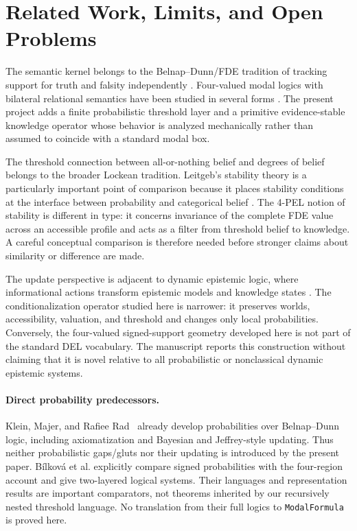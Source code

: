 \section{Related Work, Limits, and Open Problems}
\label{sec:limits}

The semantic kernel belongs to the Belnap--Dunn/FDE tradition of tracking support for truth and falsity independently \cite{Belnap1977,Dunn1976}. Four-valued modal logics with bilateral relational semantics have been studied in several forms \cite{OdintsovWansing2010,RivieccioJungJansana2017}. The present project adds a finite probabilistic threshold layer and a primitive evidence-stable knowledge operator whose behavior is analyzed mechanically rather than assumed to coincide with a standard modal box.

The threshold connection between all-or-nothing belief and degrees of belief belongs to the broader Lockean tradition. Leitgeb's stability theory is a particularly important point of comparison because it places stability conditions at the interface between probability and categorical belief \cite{Leitgeb2014}. The 4-PEL notion of stability is different in type: it concerns invariance of the complete FDE value across an accessible profile and acts as a filter from threshold belief to knowledge. A careful conceptual comparison is therefore needed before stronger claims about similarity or difference are made.

The update perspective is adjacent to dynamic epistemic logic, where informational actions transform epistemic models and knowledge states \cite{vanDitmarschHoekKooi2007}. The conditionalization operator studied here is narrower: it preserves worlds, accessibility, valuation, and threshold and changes only local probabilities. Conversely, the four-valued signed-support geometry developed here is not part of the standard DEL vocabulary. The manuscript reports this construction without claiming that it is novel relative to all probabilistic or nonclassical dynamic epistemic systems.

\paragraph{Direct probability predecessors.}
Klein, Majer, and Rafiee Rad~\cite{KleinMajerRad2021} already develop
probabilities over Belnap--Dunn logic, including axiomatization and Bayesian
and Jeffrey-style updating. Thus neither probabilistic gaps/gluts nor their
updating is introduced by the present paper. B{\'i}lkov{\'a} et al.
\cite{BilkovaEtAl2025} explicitly compare signed probabilities with the
four-region account and give two-layered logical systems. Their languages and
representation results are important comparators, not theorems inherited by
our recursively nested threshold language. No translation from their full
logics to \texttt{ModalFormula} is proved here.


